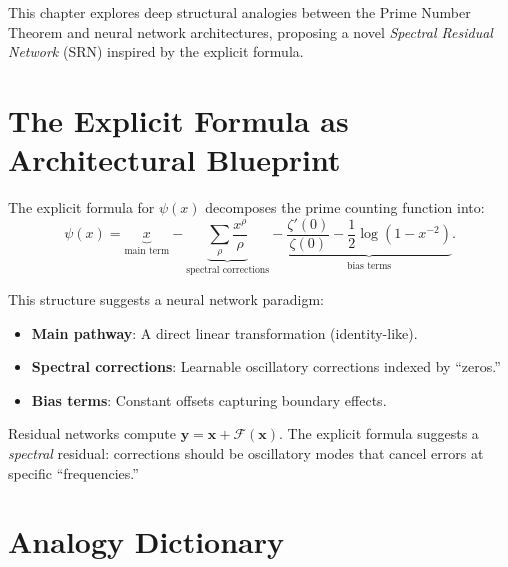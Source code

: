 This chapter explores deep structural analogies between the Prime Number Theorem and neural network architectures, proposing a novel \emph{Spectral Residual Network} (SRN) inspired by the explicit formula.

\section{The Explicit Formula as Architectural Blueprint}

The explicit formula for $\psi(x)$ decomposes the prime counting function into:
\begin{equation}
  \psi(x) = \underbrace{x}_{\text{main term}} - \underbrace{\sum_{\rho} \frac{x^{\rho}}{\rho}}_{\text{spectral corrections}} - \underbrace{\frac{\zeta'(0)}{\zeta(0)} - \frac{1}{2}\log(1 - x^{-2})}_{\text{bias terms}}.
\end{equation}

This structure suggests a neural network paradigm:
\begin{itemize}
  \item \textbf{Main pathway}: A direct linear transformation (identity-like).
  \item \textbf{Spectral corrections}: Learnable oscillatory corrections indexed by ``zeros.''
  \item \textbf{Bias terms}: Constant offsets capturing boundary effects.
\end{itemize}

\begin{remark}
  Residual networks compute $\mathbf{y} = \mathbf{x} + \mathcal{F}(\mathbf{x})$. The explicit formula suggests a \emph{spectral} residual: corrections should be oscillatory modes that cancel errors at specific ``frequencies.''
\end{remark}

\section{Analogy Dictionary}

